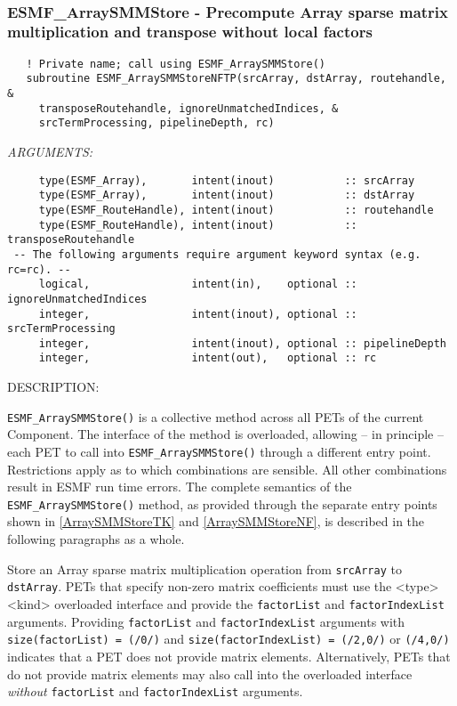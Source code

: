  
\mbox{}\hrulefill\ 
 
\subsubsection [ESMF\_ArraySMMStore] {ESMF\_ArraySMMStore - Precompute Array sparse matrix multiplication and transpose without local factors}


  
\begin{verbatim}   ! Private name; call using ESMF_ArraySMMStore()
   subroutine ESMF_ArraySMMStoreNFTP(srcArray, dstArray, routehandle, &
     transposeRoutehandle, ignoreUnmatchedIndices, &
     srcTermProcessing, pipelineDepth, rc)\end{verbatim}{\em ARGUMENTS:}
\begin{verbatim}     type(ESMF_Array),       intent(inout)           :: srcArray
     type(ESMF_Array),       intent(inout)           :: dstArray
     type(ESMF_RouteHandle), intent(inout)           :: routehandle
     type(ESMF_RouteHandle), intent(inout)           :: transposeRoutehandle
 -- The following arguments require argument keyword syntax (e.g. rc=rc). --
     logical,                intent(in),    optional :: ignoreUnmatchedIndices
     integer,                intent(inout), optional :: srcTermProcessing
     integer,                intent(inout), optional :: pipelineDepth
     integer,                intent(out),   optional :: rc\end{verbatim}
{\sf DESCRIPTION:\\ }


   \label{ArraySMMStoreNF}
   {\tt ESMF\_ArraySMMStore()} is a collective method across all PETs of the
   current Component. The interface of the method is overloaded, allowing 
   -- in principle -- each PET to call into {\tt ESMF\_ArraySMMStore()}
   through a different entry point. Restrictions apply as to which combinations
   are sensible. All other combinations result in ESMF run time errors. The
   complete semantics of the {\tt ESMF\_ArraySMMStore()} method, as provided
   through the separate entry points shown in \ref{ArraySMMStoreTK} and
   \ref{ArraySMMStoreNF}, is described in the following paragraphs as a whole.
  
     \begin{sloppypar}
     Store an Array sparse matrix multiplication operation from {\tt srcArray}
     to {\tt dstArray}. PETs that specify non-zero matrix coefficients must use
     the <type><kind> overloaded interface and provide the {\tt factorList} and
     {\tt factorIndexList} arguments. Providing {\tt factorList} and
     {\tt factorIndexList} arguments with {\tt size(factorList) = (/0/)} and
     {\tt size(factorIndexList) = (/2,0/)} or {\tt (/4,0/)} indicates that a 
     PET does not provide matrix elements. Alternatively, PETs that do not 
     provide matrix elements may also call into the overloaded interface
     {\em without} {\tt factorList} and {\tt factorIndexList} arguments.
     \end{sloppypar}
  
